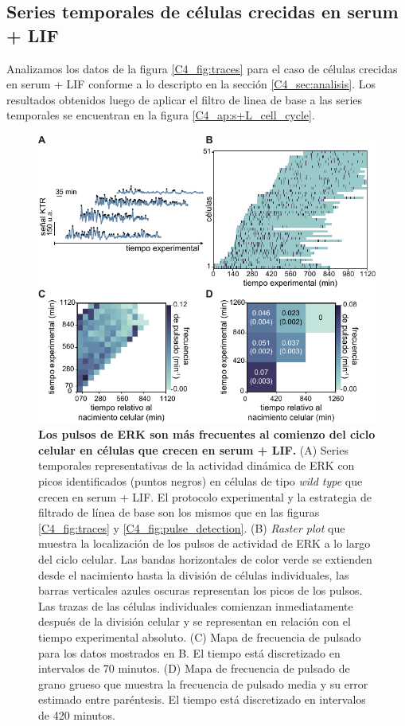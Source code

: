 \documentclass[./main.tex]{subfiles}
\begin{document}
\begin{subappendices}
\section{Series temporales de células crecidas en serum + LIF}
\label{C4_ap:s+L_cell_cycle}

Analizamos los datos de la figura \ref{C4_fig:traces} para el caso de células crecidas en serum + LIF conforme a lo descripto en la sección \ref{C4_sec:analisis}. Los resultados obtenidos luego de aplicar el filtro de linea de base a las series temporales se encuentran en la figura \ref{C4_ap:s+L_cell_cycle}.


\begin{figure}
    \centering
    \includegraphics[width=1\columnwidth]{figures/chapter4/C4_s+L_cell_cycle.pdf}\caption{\textbf{ Los pulsos de ERK son más frecuentes al comienzo del ciclo celular en células que crecen en serum + LIF.} (A) Series temporales representativas de la actividad dinámica de ERK con picos identificados (puntos negros) en células de tipo \textit{wild type} que crecen en serum + LIF. El protocolo experimental y la estrategia de filtrado de línea de base son los mismos que en las figuras \ref{C4_fig:traces} y \ref{C4_fig:pulse_detection}. (B) \textit{Raster plot} que muestra la localización de los pulsos de actividad de ERK a lo largo del ciclo celular. Las bandas horizontales de color verde se extienden desde el nacimiento hasta la división de células individuales, las barras verticales azules oscuras representan los picos de los pulsos. Las trazas de las células individuales comienzan inmediatamente después de la división celular y se representan en relación con el tiempo experimental absoluto. (C) Mapa de frecuencia de pulsado para los datos mostrados en B. El tiempo está discretizado en intervalos de 70 minutos. (D) Mapa de frecuencia de pulsado de grano grueso que muestra la frecuencia de pulsado media y su error estimado entre paréntesis. El tiempo está discretizado en intervalos de 420 minutos.}
    \label{C4_fig:s+L_cell_cycle}
\end{figure}



\end{subappendices}
\end{document}
